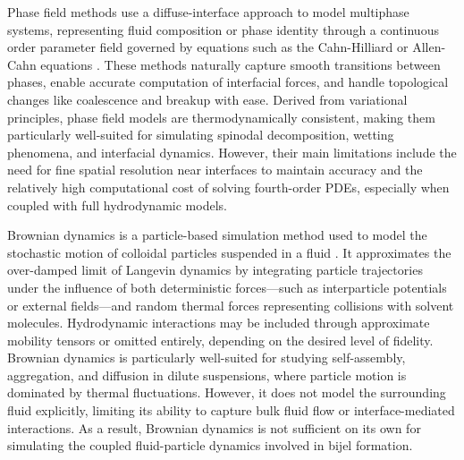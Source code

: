 Phase field methods use a diffuse-interface approach to model multiphase systems, representing fluid composition or phase identity through a continuous 
order parameter field governed by equations such as the Cahn-Hilliard or Allen-Cahn equations 
\cite{mendoza_evolution_2006, carmack_tuning_2018, chan_channel_2012}. These methods naturally capture smooth transitions between phases, enable
accurate computation of interfacial forces, and handle topological changes like coalescence and breakup with ease. Derived from variational principles, 
phase field models are thermodynamically consistent, making them particularly well-suited for simulating spinodal decomposition, wetting phenomena, and 
interfacial dynamics. However, their main limitations include the need for fine spatial resolution near interfaces to maintain accuracy and the relatively 
high computational cost of solving fourth-order PDEs, especially when coupled with full hydrodynamic models.

Brownian dynamics is a particle-based simulation method used to model the stochastic motion of colloidal particles suspended in a fluid 
\cite{huber_brownian_2019, yip_brownian_2005, elsawy_utility_2025}. It approximates the over-damped limit of Langevin dynamics by integrating 
particle trajectories under the influence of both deterministic forces—such as interparticle potentials or external fields—and random thermal 
forces representing collisions with solvent molecules. Hydrodynamic interactions may be included through approximate mobility tensors or omitted 
entirely, depending on the desired level of fidelity. Brownian dynamics is particularly well-suited for studying self-assembly, aggregation, and 
diffusion in dilute suspensions, where particle motion is dominated by thermal fluctuations. However, it does not model the surrounding fluid 
explicitly, limiting its ability to capture bulk fluid flow or interface-mediated interactions. As a result, Brownian dynamics is not sufficient 
on its own for simulating the coupled fluid-particle dynamics involved in bijel formation.


